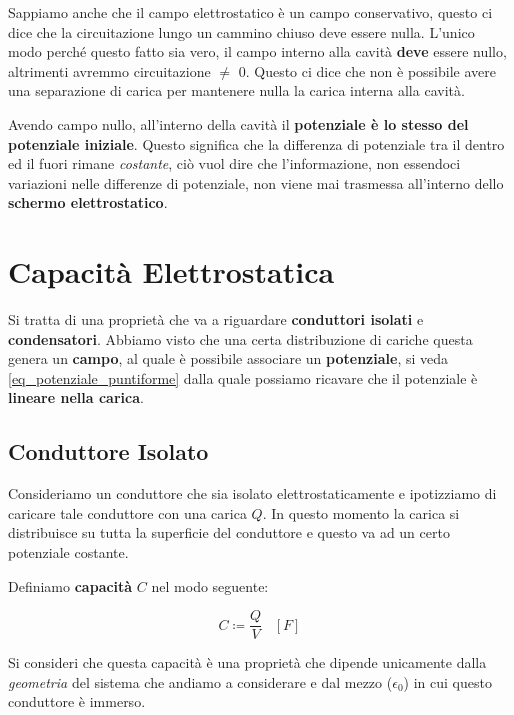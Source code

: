 Sappiamo anche che il campo elettrostatico è un campo conservativo, questo ci dice che la circuitazione lungo un cammino chiuso deve essere nulla. L'unico modo perché questo fatto sia vero, il campo interno alla cavità \textbf{deve} essere nullo, altrimenti avremmo circuitazione $\ne$ 0. Questo ci dice che non è possibile avere una separazione di carica per mantenere nulla la carica interna alla cavità.

Avendo campo nullo, all'interno della cavità il \textbf{potenziale è lo stesso del potenziale iniziale}. Questo significa che la differenza di potenziale tra il dentro ed il fuori rimane \textit{costante}, ciò vuol dire che l'informazione, non essendoci variazioni nelle differenze di potenziale, non viene mai trasmessa all'interno dello \textbf{schermo elettrostatico}. 

\section{Capacità Elettrostatica}
Si tratta di una proprietà che va a riguardare \textbf{conduttori isolati} e \textbf{condensatori}. Abbiamo visto che una certa distribuzione di cariche questa genera un \textbf{campo}, al quale è possibile associare un \textbf{potenziale}, si veda \ref{eq_potenziale_puntiforme} dalla quale possiamo ricavare che il potenziale è \textbf{lineare nella carica}. 

\subsection{Conduttore Isolato}

Consideriamo un conduttore che sia isolato elettrostaticamente e ipotizziamo di caricare tale conduttore con una carica $Q$. In questo momento la carica si distribuisce su tutta la superficie del conduttore e questo va ad un certo potenziale costante.

Definiamo \textbf{capacità} $C$ nel modo seguente: 

\begin{large}
	\begin{equation} \label{eq_cap_cond_isolato}
		C \coloneqq \frac{Q}{V}   \; \;\;\left[ F\right]
	\end{equation}
\end{large}

Si consideri che questa capacità è una proprietà che dipende unicamente dalla \textit{geometria} del sistema che andiamo a considerare e dal mezzo ($\epsilon_0$) in cui questo conduttore è immerso.


